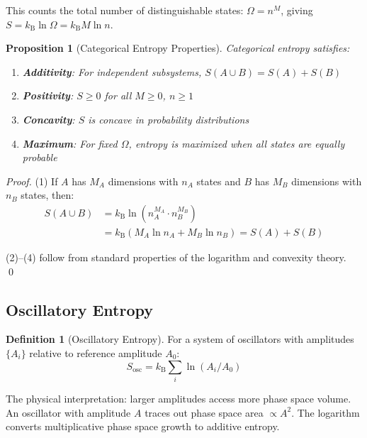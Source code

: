 \documentclass[twocolumn,10pt]{article}
\newtheorem{proposition}[theorem]{Proposition}
\theoremstyle{definition}
\newtheorem{definition}[theorem]{Definition}
\theoremstyle{remark}
\newcommand{\kB}{k_{\mathrm{B}}}
\begin{document}
This counts the total number of distinguishable states: $\Omega = n^M$, giving $S = \kB \ln \Omega = \kB M \ln n$.

\begin{proposition}[Categorical Entropy Properties]
\label{prop:cat_props}
Categorical entropy satisfies:
\begin{enumerate}
\item \textbf{Additivity}: For independent subsystems, $S(A \cup B) = S(A) + S(B)$
\item \textbf{Positivity}: $S \geq 0$ for all $M \geq 0$, $n \geq 1$
\item \textbf{Concavity}: $S$ is concave in probability distributions
\item \textbf{Maximum}: For fixed $\Omega$, entropy is maximized when all states are equally probable
\end{enumerate}
\end{proposition}

\begin{proof}
(1) If $A$ has $M_A$ dimensions with $n_A$ states and $B$ has $M_B$ dimensions with $n_B$ states, then:
\begin{align}
S(A \cup B) &= \kB \ln(n_A^{M_A} \cdot n_B^{M_B}) \\
&= \kB(M_A \ln n_A + M_B \ln n_B) = S(A) + S(B)
\end{align}

(2)--(4) follow from standard properties of the logarithm and convexity theory. \qed
\end{proof}

\subsection{Oscillatory Entropy}

\begin{definition}[Oscillatory Entropy]
\label{def:osc_entropy}
For a system of oscillators with amplitudes $\{A_i\}$ relative to reference amplitude $A_0$:
\begin{equation}
S_{\text{osc}} = \kB \sum_i \ln(A_i/A_0)
\label{eq:oscillatory_entropy}
\end{equation}
\end{definition}

The physical interpretation: larger amplitudes access more phase space volume. An oscillator with amplitude $A$ traces out phase space area $\propto A^2$. The logarithm converts multiplicative phase space growth to additive entropy.
\end{document}

